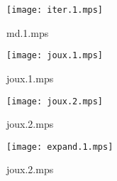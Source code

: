 \documentclass[letterpaper,10pt]{article}
\begin{document}
\begin{figure}
    \centering
    \texttt{[image: iter.1.mps]}
    \caption{md.1.mps}
\end{figure}

\begin{figure}
    \centering
    \texttt{[image: joux.1.mps]}
    \caption{joux.1.mps}
\end{figure}

\begin{figure}
    \centering
    \texttt{[image: joux.2.mps]}
    \caption{joux.2.mps}
\end{figure}

\begin{figure}
    \centering
    \texttt{[image: expand.1.mps]}
    \caption{joux.2.mps}
\end{figure}
\end{document}
